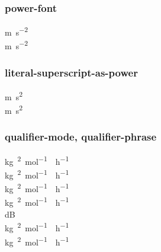 \documentclass{article}
\begin{document}
\subsubsection{power-font}
\si{\metre\per\second\squared} \\
\si[power-font = unit]{\metre\per\second\squared}\\

\subsubsection{literal-superscript-as-power}
\si{m.s^{2}} \\
\si[literal-superscript-as-power = false]{m.s^{2}}\\

\subsubsection{qualifier-mode, qualifier-phrase}
\si{\kilogram\polymer\squared\per\mole\catalyst\per\hour} \\
\si[qualifier-mode = brackets]
{\kilogram\polymer\squared\per\mole\catalyst\per\hour} \\
\si[qualifier-mode = subscript]
{\kilogram\polymer\squared\per\mole\catalyst\per\hour} \\
\si[qualifier-mode = space]
{\kilogram\polymer\squared\per\mole\catalyst\per\hour} \\
\si[qualifier-mode = text]
{\deci\bel\isotropic}\\

\si[qualifier-mode = phrase]
{\kilogram\polymer\squared\per\mole\catalyst\per\hour} \\
\si[qualifier-mode = phrase, qualifier-phrase = { by }]
{\kilogram\polymer\squared\per\mole\catalyst\per\hour} \\
\end{document}
